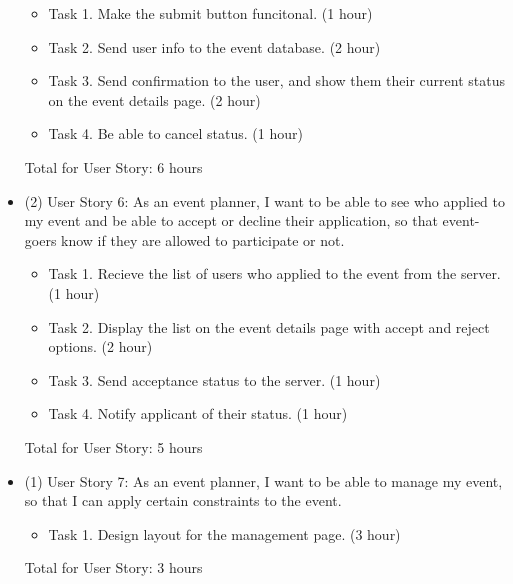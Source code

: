 \documentclass[10pt]{article}
\newcommand{\fancysubX}[2] {{\color{primary}\subsection*{#1} \label{sec:#2}}}
\begin{document}
\begin{itemize}
                \begin{itemize}
                    \item Task 1. Make the submit button funcitonal. (1 hour)
		    \item Task 2. Send user info to the event database. (2 hour)
		    \item Task 3. Send confirmation to the user, and show them their current status on the event details page. (2 hour)
		    \item Task 4. Be able to cancel status. (1 hour)
                \end{itemize}
                Total for User Story: 6 hours
	    \item (2) User Story 6: As an event planner, I want to be able to see who applied to my event and be able to accept or decline their application, so that event-goers know if they are allowed to participate or not.

		\begin{itemize}
		    \item Task 1. Recieve the list of users who applied to the event from the server. (1 hour)
		    \item Task 2. Display the list on the event details page with accept and reject options. (2 hour)
		    \item Task 3. Send acceptance status to the server. (1 hour)
		    \item Task 4. Notify applicant of their status. (1 hour)
		\end{itemize}
		Total for User Story: 5 hours
	    \item (1) User Story 7: As an event planner, I want to be able to manage my event, so that I can apply certain constraints to the event.

		\begin{itemize}
		    \item Task 1. Design layout for the management page. (3 hour)
		\end{itemize}
		Total for User Story: 3 hours
        \end{itemize}
     
        
\end{document}
